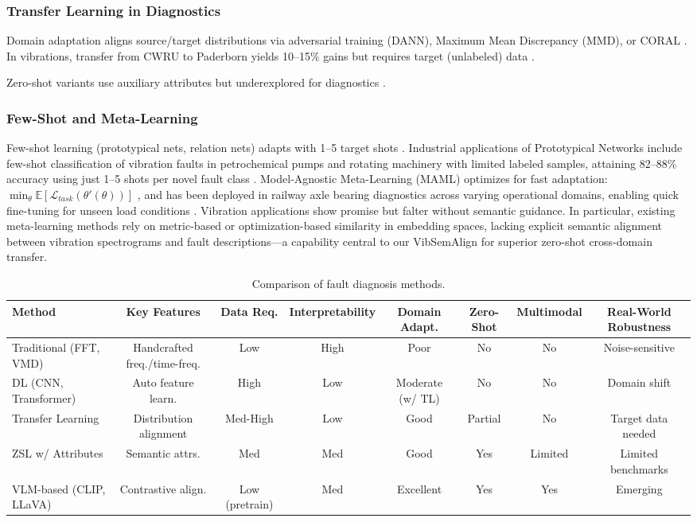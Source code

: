 \subsubsection{Transfer Learning in Diagnostics}
Domain adaptation aligns source/target distributions via adversarial training (DANN), Maximum Mean Discrepancy (MMD), or CORAL \cite{qiao2022grl,li2021mmd,wen2020domain}. In vibrations, transfer from CWRU to Paderborn yields 10--15\% gains but requires target (unlabeled) data \cite{wang2020transfer}.

Zero-shot variants use auxiliary attributes but underexplored for diagnostics \cite{chen2023gzsl}.

\subsubsection{Few-Shot and Meta-Learning}
Few-shot learning (prototypical nets, relation nets) adapts with 1--5 target shots \cite{hoang2023vit}. Industrial applications of Prototypical Networks include few-shot classification of vibration faults in petrochemical pumps and rotating machinery with limited labeled samples, attaining 82--88\% accuracy using just 1--5 shots per novel fault class \cite{hoang2023vit}. Model-Agnostic Meta-Learning (MAML) optimizes for fast adaptation: $\min_\theta \mathbb{E} [\mathcal{L}_{task}(\theta'(\theta))]$ \cite{wen2022maml}, and has been deployed in railway axle bearing diagnostics across varying operational domains, enabling quick fine-tuning for unseen load conditions \cite{wen2022maml}. Vibration applications show promise but falter without semantic guidance. In particular, existing meta-learning methods rely on metric-based or optimization-based similarity in embedding spaces, lacking explicit semantic alignment between vibration spectrograms and fault descriptions---a capability central to our VibSemAlign for superior zero-shot cross-domain transfer.

\begin{table}[t]
\centering
\caption{Comparison of fault diagnosis methods.}
\label{tab:comparison}
\begin{tabular}{@{}lccccccc@{}}
\toprule
Method & Key Features & Data Req. & Interpretability & Domain Adapt. & Zero-Shot & Multimodal & Real-World Robustness \\
\midrule
Traditional (FFT, VMD) & Handcrafted freq./time-freq. & Low & High & Poor & No & No & Noise-sensitive \\
DL (CNN, Transformer) & Auto feature learn. & High & Low & Moderate (w/ TL) & No & No & Domain shift \\
Transfer Learning & Distribution alignment & Med-High & Low & Good & Partial & No & Target data needed \\
ZSL w/ Attributes & Semantic attrs. & Med & Med & Good & Yes & Limited & Limited benchmarks \\
VLM-based (CLIP, LLaVA) & Contrastive align. & Low (pretrain) & Med & Excellent & Yes & Yes & Emerging \\
\bottomrule
\end{tabular}
\end{table}


